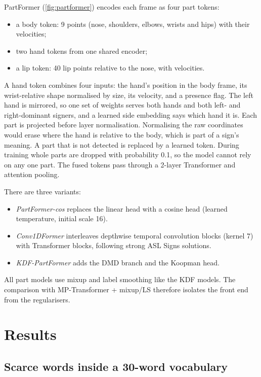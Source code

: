 \documentclass[11pt]{article}
\begin{document}
PartFormer (\cref{fig:partformer}) encodes each frame as four part tokens:
\begin{itemize}
  \item a body token: 9 points (nose, shoulders, elbows, wrists and hips) with their
  velocities;
  \item two hand tokens from one shared encoder;
  \item a lip token: 40 lip points relative to the nose, with velocities.
\end{itemize}
A hand token combines four inputs: the hand's position in the body frame, its wrist-relative
shape normalised by size, its velocity, and a presence flag. The left hand is mirrored, so
one set of weights serves both hands and both left- and right-dominant signers, and a learned
side embedding says which hand it is. Each part is projected before layer normalisation.
Normalising the raw coordinates would erase where the hand is relative to the body, which is
part of a sign's meaning. A part that is not detected is replaced by a learned token. During
training whole parts are dropped with probability 0.1, so the model cannot rely on any one
part. The fused tokens pass through a 2-layer Transformer and attention pooling.

There are three variants:
\begin{itemize}
  \item \emph{PartFormer-cos} replaces the linear head with a cosine head (learned
  temperature, initial scale 16).
  \item \emph{Conv1DFormer} interleaves depthwise temporal convolution blocks (kernel 7) with
  Transformer blocks, following strong ASL Signs solutions.
  \item \emph{KDF-PartFormer} adds the DMD branch and the Koopman head.
\end{itemize}
All part models use mixup and label smoothing like the KDF models. The comparison with
MP-Transformer + mixup/LS therefore isolates the front end from the regularisers.



\section{Results}\label{sec:results}

\subsection{Scarce words inside a 30-word vocabulary}
\end{document}
